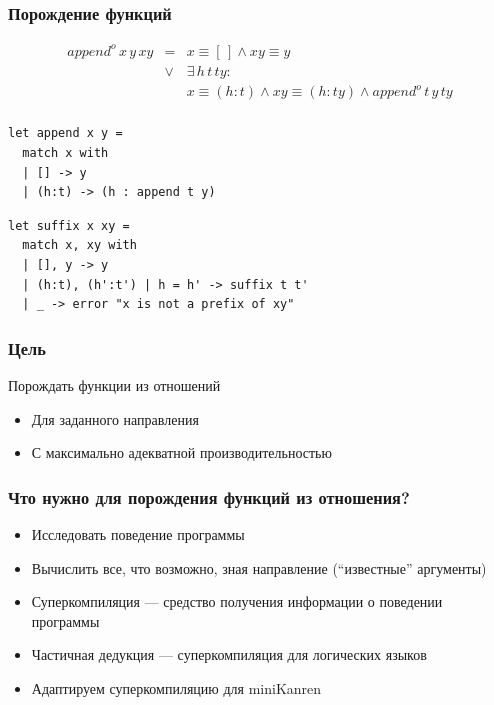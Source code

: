 \documentclass{beamer}
\begin{document}
\begin{frame}[fragile]
  \transwipe[direction=90]
  \frametitle{Порождение функций}
$$
\begin{array}{lrl}
append^{o} \, x \, y \, xy & =    & x \equiv [\,] \wedge xy \equiv y \\
                           & \vee & \exists \, h \, t \, ty :  \\
                           &      & x \equiv (h:t) \wedge xy \equiv (h:ty) \wedge append^{o} \, t \, y \, ty \\ 
\end{array}
$$

\begin{lstlisting}[frame=single]  
let append x y =
  match x with
  | [] -> y
  | (h:t) -> (h : append t y)
\end{lstlisting}

\pause

\begin{lstlisting}[frame=single]  
let suffix x xy =
  match x, xy with
  | [], y -> y
  | (h:t), (h':t') | h = h' -> suffix t t'
  | _ -> error "x is not a prefix of xy"
\end{lstlisting}
\end{frame}

\begin{frame}[fragile]
  \transwipe[direction=90]
  \frametitle{Цель}

Порождать функции из отношений

\begin{itemize}
  \item Для заданного направления
  \item С максимально адекватной производительностью 
\end{itemize}
\end{frame}

\begin{frame}[fragile]
  \transwipe[direction=90]
  \frametitle{Что нужно для порождения функций из отношения?}
\begin{itemize}
  \item Исследовать поведение программы
  \item Вычислить все, что возможно, зная направление (``известные'' аргументы)
\end{itemize}

\pause

\begin{itemize}
  \item Суперкомпиляция --- средство получения информации о поведении программы
  \item Частичная дедукция --- суперкомпиляция для логических языков
  \item Адаптируем суперкомпиляцию для miniKanren
\end{itemize}
\end{frame}
\end{document}

